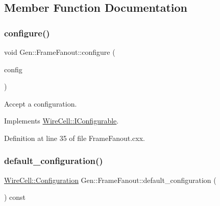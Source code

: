 \subsection{Member Function Documentation}
\mbox{\label{class_wire_cell_1_1_gen_1_1_frame_fanout_a66602d8adef18040786c72aad4d927ec}} 
\subsubsection{\texorpdfstring{configure()}{configure()}}
{\footnotesize\ttfamily void Gen\+::\+Frame\+Fanout\+::configure (\begin{DoxyParamCaption}\item[{const \hyperlink{namespace_wire_cell_a9f705541fc1d46c608b3d32c182333ee}{Wire\+Cell\+::\+Configuration} \&}]{config }\end{DoxyParamCaption})\hspace{0.3cm}{\ttfamily [virtual]}}



Accept a configuration. 



Implements \hyperlink{class_wire_cell_1_1_i_configurable_a57ff687923a724093df3de59c6ff237d}{Wire\+Cell\+::\+I\+Configurable}.



Definition at line 35 of file Frame\+Fanout.\+cxx.

\mbox{\label{class_wire_cell_1_1_gen_1_1_frame_fanout_a1a88680f563eec18653bddfd71925cdd}} 
\subsubsection{\texorpdfstring{default\+\_\+configuration()}{default\_configuration()}}
{\footnotesize\ttfamily \hyperlink{namespace_wire_cell_a9f705541fc1d46c608b3d32c182333ee}{Wire\+Cell\+::\+Configuration} Gen\+::\+Frame\+Fanout\+::default\+\_\+configuration (\begin{DoxyParamCaption}{ }\end{DoxyParamCaption}) const\hspace{0.3cm}{\ttfamily [virtual]}}



